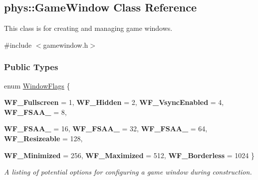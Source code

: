 \hypertarget{classphys_1_1GameWindow}{
\subsection{phys::GameWindow Class Reference}
\label{classphys_1_1GameWindow}
}


This class is for creating and managing game windows.  




{\ttfamily \#include $<$gamewindow.h$>$}

\subsubsection*{Public Types}
\begin{DoxyCompactItemize}
\item 
enum \hyperlink{classphys_1_1GameWindow_ae4c6f1cc436ac9f20e43bd21a99885f5}{WindowFlags} \{ \par
{\bfseries WF\_\-Fullscreen} =  1, 
{\bfseries WF\_\-Hidden} =  2, 
{\bfseries WF\_\-VsyncEnabled} =  4, 
{\bfseries WF\_\-FSAA\_} =  8, 
\par
{\bfseries WF\_\-FSAA\_} =  16, 
{\bfseries WF\_\-FSAA\_} =  32, 
{\bfseries WF\_\-FSAA\_} =  64, 
{\bfseries WF\_\-Resizeable} =  128, 
\par
{\bfseries WF\_\-Minimized} =  256, 
{\bfseries WF\_\-Maximized} =  512, 
{\bfseries WF\_\-Borderless} =  1024
 \}
\begin{DoxyCompactList}\small\item\em A listing of potential options for configuring a game window during construction. \item\end{DoxyCompactList}\end{DoxyCompactItemize}
